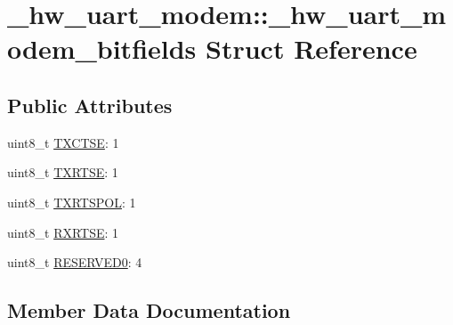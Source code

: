 \hypertarget{struct__hw__uart__modem_1_1__hw__uart__modem__bitfields}{}\section{\+\_\+hw\+\_\+uart\+\_\+modem\+:\+:\+\_\+hw\+\_\+uart\+\_\+modem\+\_\+bitfields Struct Reference}
\label{struct__hw__uart__modem_1_1__hw__uart__modem__bitfields}
\subsection*{Public Attributes}
\begin{DoxyCompactItemize}
\item 
uint8\+\_\+t \hyperlink{struct__hw__uart__modem_1_1__hw__uart__modem__bitfields_a39fe289895f17c445ee8ff7ff04d6f96}{T\+X\+C\+T\+SE}\+: 1
\item 
uint8\+\_\+t \hyperlink{struct__hw__uart__modem_1_1__hw__uart__modem__bitfields_a1ded33c482607d8d8a9c0ea2948240ea}{T\+X\+R\+T\+SE}\+: 1
\item 
uint8\+\_\+t \hyperlink{struct__hw__uart__modem_1_1__hw__uart__modem__bitfields_ac1a913c423fede161d30c6619c122b00}{T\+X\+R\+T\+S\+P\+OL}\+: 1
\item 
uint8\+\_\+t \hyperlink{struct__hw__uart__modem_1_1__hw__uart__modem__bitfields_a8a7f0fa7bd5d7408d5993d09a17be126}{R\+X\+R\+T\+SE}\+: 1
\item 
uint8\+\_\+t \hyperlink{struct__hw__uart__modem_1_1__hw__uart__modem__bitfields_adf6d53d4e1b14f03a707db777506be60}{R\+E\+S\+E\+R\+V\+E\+D0}\+: 4
\end{DoxyCompactItemize}


\subsection{Member Data Documentation}
